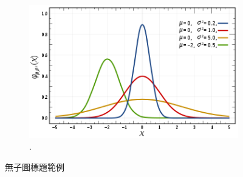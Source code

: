 \begin{figure}[!htb]
\begin{subfigure}{0.4\textwidth}
        \caption{}
        \label{fig:third_nocaption}
    \end{subfigure}
    \begin{subfigure}{0.4\textwidth}
        \includegraphics[width=\textwidth]{figures/gambar.png}
        \caption{.}
        \label{fig:fourth_nocaption}
    \end{subfigure}
    \caption{無子圖標題範例}
    \label{fig:four_nocaption}
\end{figure}
